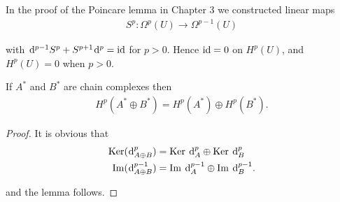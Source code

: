 \begin{remark}\label{remark:4-12}
  In the proof of the Poincare lemma in Chapter 3 we constructed
linear maps
\begin{align*}
  S^p: \Omega^p(U)\to\Omega^{p-1}(U)
\end{align*}

with $\dd^{p-1}S^p + S^{p+1}\dd^p = \id$ for $p>0$. Hence $\operatorname{id}=0$ on $H^p(U)$, and $H^p(U) = 0$
when $p>0$.
\end{remark}

\begin{lemma}\label{lemma:4-13}
  If $A^*$ and $B^*$ are chain complexes then 
  \begin{align*}
    H^p(A^*\oplus B^*) = H^p(A^*)\oplus H^p(B^*).
  \end{align*}
\end{lemma}

\begin{proof}
  It is obvious that 
  \begin{align*}
    \ker(\!\dd^p_{A\oplus B}) & = \ker\dd^p_A\oplus \ker\dd^p_B \\
    \im(\!\dd^{p-1}_{A\oplus B}) & = \im\dd^{p-1}_A\oplus \im\dd^{p-1}_B.
  \end{align*}

  and the lemma follows.
\end{proof}















































